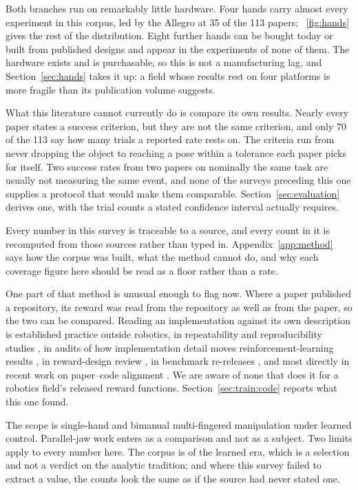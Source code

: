 Both branches run on remarkably little hardware. Four hands carry almost every experiment in
this corpus, led by the Allegro at 35 of the 113 papers; \figurename~\ref{fig:hands} gives the
rest of the distribution. Eight further hands can be bought today or built from published designs
and appear in the experiments of none of them. The hardware exists and is purchasable, so this is
not a manufacturing lag, and Section~\ref{sec:hands} takes it up: a field whose results rest on
four platforms is more fragile than its publication volume suggests.

What this literature cannot currently do is compare its own results. Nearly every paper states
a success criterion, but they are not the same criterion, and only 70 of the 113 say how many
trials a reported rate rests on. The criteria run from never dropping the object to
reaching a pose within a tolerance each paper picks for itself. Two success rates from two
papers on nominally the same task are usually not measuring the same event, and none of the
surveys preceding this one supplies a protocol that would make them comparable.
Section~\ref{sec:evaluation} derives one, with the trial counts a stated confidence interval
actually requires.

Every number in this survey is traceable to a source, and every count in it is recomputed from
those sources rather than typed in. Appendix~\ref{app:method} says how the corpus was built, what
the method cannot do, and why each coverage figure here should be read as a floor rather than a
rate.

One part of that method is unusual enough to flag now. Where a paper published a repository, its
reward was read from the repository as well as from the paper, so the two can be compared.
Reading an implementation against its own
description is established practice outside robotics, in repeatability and reproducibility
studies \cite{collberg_repeatability_2016, raff_reproducibility_2019}, in audits of how
implementation detail moves reinforcement-learning results
\cite{engstrom_implementation_matters_2020}, in reward-design review
\cite{knox_reward_misdesign_2023}, in benchmark re-releases \cite{metaworld_plus_2025}, and
most directly in recent work on paper--code alignment \cite{scicoqa_2026, biocon_2026}. We are
aware of none that does it for a robotics field's released reward functions.
Section~\ref{sec:train:code} reports what this one found.

The scope is single-hand and bimanual multi-fingered manipulation under learned control.
Parallel-jaw work enters as a comparison and not as a subject. Two limits apply to every number
here. The corpus is of the learned era, which is a selection and not a verdict on the analytic
tradition; and where this survey failed to extract a value, the counts look the same as if the
source had never stated one.

